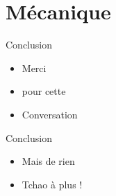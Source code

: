 \section{Mécanique}
\begin{frame}{Conclusion}
  \begin{itemize}
    \item Merci
    \item pour cette
    \item Conversation
  \end{itemize}
\end{frame}

\begin{frame}{Conclusion}
  \begin{itemize}
    \item Mais de rien
    \item Tchao à plus !
  \end{itemize}
\end{frame}
